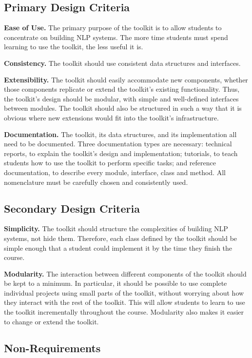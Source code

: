 \documentclass[11pt]{article}
\begin{document}
\subsection{Primary Design Criteria}

\textbf{Ease of Use.} The primary purpose of the toolkit is to allow
students to concentrate on building NLP systems.  The more time
students must spend learning to use the toolkit, the less useful it
is.  

\textbf{Consistency.} The toolkit should use consistent data structures
and interfaces.

\textbf{Extensibility.} The toolkit should easily accommodate new
components, whether those components replicate or extend the toolkit's
existing functionality.  Thus, the toolkit's design should be modular,
with simple and well-defined interfaces between modules.  The toolkit
should also be structured in such a way that it is obvious where new
extensions would fit into the toolkit's infrastructure.

\textbf{Documentation.} The toolkit, its data structures, and its
implementation all need to be documented.  Three documentation types
are necessary: technical reports, to explain the toolkit's
design and implementation; tutorials, to teach students how to use the
toolkit to perform specific tasks; and reference documentation, to describe
every module, interface, class and method.  All nomenclature must be
carefully chosen and consistently used.

\subsection{Secondary Design Criteria}

\textbf{Simplicity.} The toolkit should structure the complexities of
building NLP systems, not hide them.  Therefore, each class defined by 
the toolkit should be simple enough that a student could implement it
by the time they finish the course.

\textbf{Modularity.} The interaction between different components of the
toolkit should be kept to a minimum.  In particular, it should be
possible to use complete individual projects using small parts of the
toolkit, without worrying about how they interact with the rest of the
toolkit.  This will allow students to learn to use the toolkit
incrementally throughout the course.  Modularity also makes it easier
to change or extend the toolkit.

\subsection{Non-Requirements}
\end{document}
